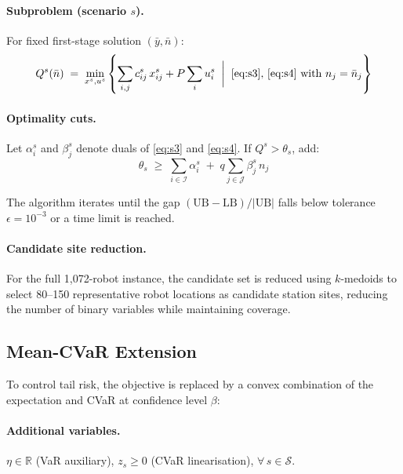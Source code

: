 \documentclass[11pt,a4paper]{article}
\begin{document}
\paragraph{Subproblem (scenario $s$).}
For fixed first-stage solution $(\bar{y}, \bar{n})$:
\begin{equation}\label{eq:sub}
  Q^s(\bar{n}) \;=\; \min_{x^s, u^s}
  \left\{
    \sum_{i,j} c_{ij}^s \, x_{ij}^s + P \sum_i u_i^s
    \;\;\bigg|\;\;
    \eqref{eq:s3},\, \eqref{eq:s4} \text{ with } n_j = \bar{n}_j
  \right\}
\end{equation}

\paragraph{Optimality cuts.}
Let $\alpha_i^s$ and $\beta_j^s$ denote duals of \eqref{eq:s3} and \eqref{eq:s4}.
If $Q^s > \theta_s$, add:
\begin{equation}\label{eq:cut}
  \theta_s \;\geq\; \sum_{i \in \mathcal{I}} \alpha_i^s
  \;+\; q \sum_{j \in \mathcal{J}} \beta_j^s \, n_j
  \tag{OC}
\end{equation}

\noindent
The algorithm iterates until the gap $(\text{UB} - \text{LB}) / |\text{UB}|$ falls below tolerance $\epsilon = 10^{-3}$ or a time limit is reached.

\paragraph{Candidate site reduction.}
For the full 1,072-robot instance, the candidate set is reduced using $k$-medoids to select 80--150 representative robot locations as candidate station sites, reducing the number of binary variables while maintaining coverage.


\subsection{Mean-CVaR Extension}
\label{sec:cvar}

To control tail risk, the objective is replaced by a convex combination of the expectation and CVaR at confidence level $\beta$:

\paragraph{Additional variables.}
$\eta \in \mathbb{R}$ (VaR auxiliary), $z_s \geq 0$ (CVaR linearisation), $\forall\, s \in \mathcal{S}$.
\end{document}
